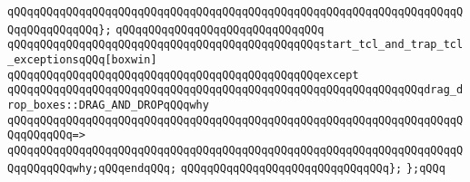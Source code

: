 \verb|qQQqqQQqqQQqqQQqqQQqqQQqqQQqqQQqqQQqqQQqqQQqqQQqqQQqqQQqqQQqqQQqqQQqqQQqqQQqqQQqqQQq};|\newline
\newline
\verb|qQQqqQQqqQQqqQQqqQQqqQQqqQQqqQQq|\newline
\verb|qQQqqQQqqQQqqQQqqQQqqQQqqQQqqQQqqQQqqQQqqQQqqQQqstart_tcl_and_trap_tcl_exceptionsqQQq[boxwin]|\newline
\verb|qQQqqQQqqQQqqQQqqQQqqQQqqQQqqQQqqQQqqQQqqQQqqQQqexcept|\newline
\verb|qQQqqQQqqQQqqQQqqQQqqQQqqQQqqQQqqQQqqQQqqQQqqQQqqQQqqQQqqQQqqQQqdrag_drop_boxes::DRAG_AND_DROPqQQqwhy|\newline
\verb|qQQqqQQqqQQqqQQqqQQqqQQqqQQqqQQqqQQqqQQqqQQqqQQqqQQqqQQqqQQqqQQqqQQqqQQqqQQqqQQq=>|\newline
\verb|qQQqqQQqqQQqqQQqqQQqqQQqqQQqqQQqqQQqqQQqqQQqqQQqqQQqqQQqqQQqqQQqqQQqqQQqqQQqqQQqwhy;qQQqendqQQq;|\newline
\verb|qQQqqQQqqQQqqQQqqQQqqQQqqQQqqQQq};|\newline
\newline
\verb|};qQQq|\newline
\newline
\newline
\newline
\newline
\newline
\newline
\newline
\newline
\newline

